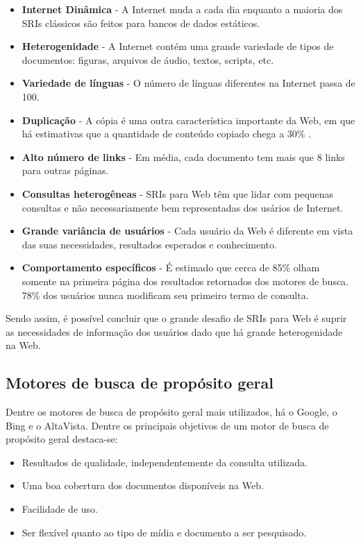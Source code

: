 \begin{itemize}
	\item \textbf{Internet Dinâmica} - A Internet muda a cada dia enquanto a maioria dos SRIs clássicos são feitos para bancos de dados estáticos.
	\item \textbf{Heterogenidade} - A Internet contém uma grande variedade de tipos de documentos: figuras, arquivos de áudio, textos, scripts, etc.
	\item \textbf{Variedade de línguas} - O número de línguas diferentes na Internet passa de 100.
	\item \textbf{Duplicação} - A cópia é uma outra característica importante da Web, em que há estimativas que a quantidade de conteúdo copiado chega a 30\% \cite{surveyir}.
	\item \textbf{Alto número de links} - Em média, cada documento tem mais que 8 links para outras páginas.
	\item \textbf{Consultas heterogêneas} - SRIs para Web têm que lidar com pequenas consultas e não necessariamente bem representadas dos usários de Internet.
	\item \textbf{Grande variância de usuários} - Cada usuário da Web é diferente em vista das suas necessidades, resultados esperados e conhecimento.
	\item \textbf{Comportamento específicos} - É estimado que cerca de 85\% olham somente na primeira página dos resultados retornados dos motores de busca. 78\% dos usuários nunca modificam seu primeiro termo de consulta.
\end{itemize}

Sendo assim, é possível concluir que o grande desafio de SRIs para Web é suprir as necessidades de informação dos usuários dado que há grande heterogenidade na Web.

\subsection{Motores de busca de propósito geral}

Dentre os motores de busca de propósito geral mais utilizados, há o Google, o Bing e o AltaVista. Dentre os principais objetivos de um motor de busca de propósito geral destaca-se: 

\begin{itemize}
	\item Resultados de qualidade, independentemente da consulta utilizada.
	\item Uma boa cobertura dos documentos disponíveis na Web.
	\item Facilidade de uso.
	\item Ser flexível quanto ao tipo de mídia e documento a ser pesquisado.
\end{itemize}

